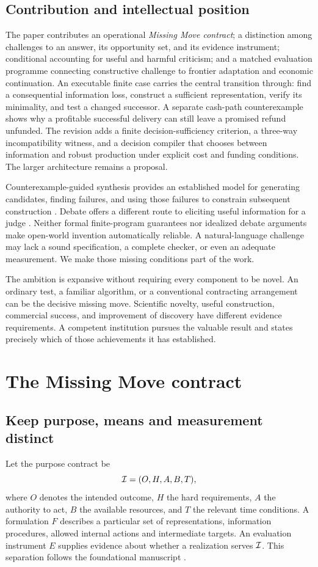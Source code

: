 \subsection{Contribution and intellectual position}
The paper contributes an operational \emph{Missing Move contract}; a distinction among challenges to an answer, its opportunity set, and its evidence instrument; conditional accounting for useful and harmful criticism; and a matched evaluation programme connecting constructive challenge to frontier adaptation and economic continuation. An executable finite case carries the central transition through: find a consequential information loss, construct a sufficient representation, verify its minimality, and test a changed successor. A separate cash-path counterexample shows why a profitable successful delivery can still leave a promised refund unfunded. The revision adds a finite decision-sufficiency criterion, a three-way incompatibility witness, and a decision compiler that chooses between information and robust production under explicit cost and funding conditions. The larger architecture remains a proposal.

Counterexample-guided synthesis provides an established model for generating candidates, finding failures, and using those failures to constrain subsequent construction \citep{cegis}. Debate offers a different route to eliciting useful information for a judge \citep{debate}. Neither formal finite-program guarantees nor idealized debate arguments make open-world invention automatically reliable. A natural-language challenge may lack a sound specification, a complete checker, or even an adequate measurement. We make those missing conditions part of the work.

The ambition is expansive without requiring every component to be novel. An ordinary test, a familiar algorithm, or a conventional contracting arrangement can be the decisive missing move. Scientific novelty, useful construction, commercial success, and improvement of discovery have different evidence requirements. A competent institution pursues the valuable result and states precisely which of those achievements it has established.

\section{The Missing Move contract}
\label{sec:contract}
\subsection{Keep purpose, means and measurement distinct}
Let the purpose contract be
\begin{equation}
\mathcal{I}=(O,H,A,B,T),
\end{equation}
where $O$ denotes the intended outcome, $H$ the hard requirements, $A$ the authority to act, $B$ the available resources, and $T$ the relevant time conditions. A formulation $F$ describes a particular set of representations, information procedures, allowed internal actions and intermediate targets. An evaluation instrument $E$ supplies evidence about whether a realization serves $\mathcal{I}$. This separation follows the foundational manuscript \citep[\S2]{boucher_ti}.

